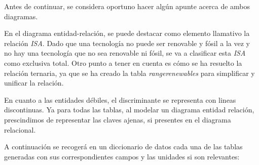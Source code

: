 Antes de continuar, se considera oportuno hacer algún apunte acerca de ambos diagramas.

En el diagrama entidad-relación, se puede destacar como elemento llamativo la relación \textit{ISA}. Dado que una tecnología no puede ser renovable y fósil a la vez y no hay una tecnología que no sea renovable ni fósil, se va a clasificar esta \textit{ISA} como exclusiva total. 
Otro punto a tener en cuenta es cómo se ha resuelto la relación ternaria, ya que se ha creado la tabla \textit{rangerenewables} para simplificar y unificar la relación.

En cuanto a las entidades débiles, el discriminante se representa con lineas discontinuas. Ya para todas las tablas, al modelar un diagrama entidad relación, prescindimos de representar las claves ajenas, si presentes en el diagrama relacional.

A continuación se recogerá en un diccionario de datos cada una de las tablas generadas con sus correspondientes campos y las unidades si son relevantes:

